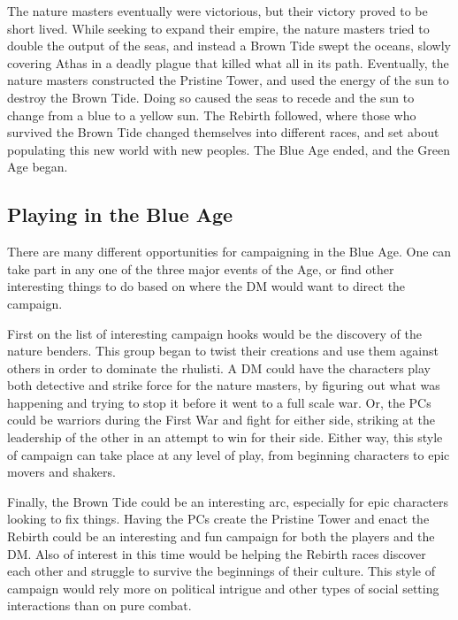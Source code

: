 The nature masters eventually were victorious, but their victory proved to be short lived. While seeking to expand their empire, the nature masters tried to double the output of the seas, and instead a Brown Tide swept the oceans, slowly covering Athas in a deadly plague that killed what all in its path. Eventually, the nature masters constructed the Pristine Tower, and used the energy of the sun to destroy the Brown Tide. Doing so caused the seas to recede and the sun to change from a blue to a yellow sun. The Rebirth followed, where those who survived the Brown Tide changed themselves into different races, and set about populating this new world with new peoples. The Blue Age ended, and the Green Age began.

\subsection{Playing in the Blue Age}
There are many different opportunities for campaigning in the Blue Age. One can take part in any one of the three major events of the Age, or find other interesting things to do based on where the DM would want to direct the campaign.

First on the list of interesting campaign hooks would be the discovery of the nature benders. This group began to twist their creations and use them against others in order to dominate the rhulisti. A DM could have the characters play both detective and strike force for the nature masters, by figuring out what was happening and trying to stop it before it went to a full scale war. Or, the PCs could be warriors during the First War and fight for either side, striking at the leadership of the other in an attempt to win for their side. Either way, this style of campaign can take place at any level of play, from beginning characters to epic movers and shakers.

Finally, the Brown Tide could be an interesting arc, especially for epic characters looking to fix things. Having the PCs create the Pristine Tower and enact the Rebirth could be an interesting and fun campaign for both the players and the DM. Also of interest in this time would be helping the Rebirth races discover each other and struggle to survive the beginnings of their culture. This style of campaign would rely more on political intrigue and other types of social setting interactions than on pure combat.

